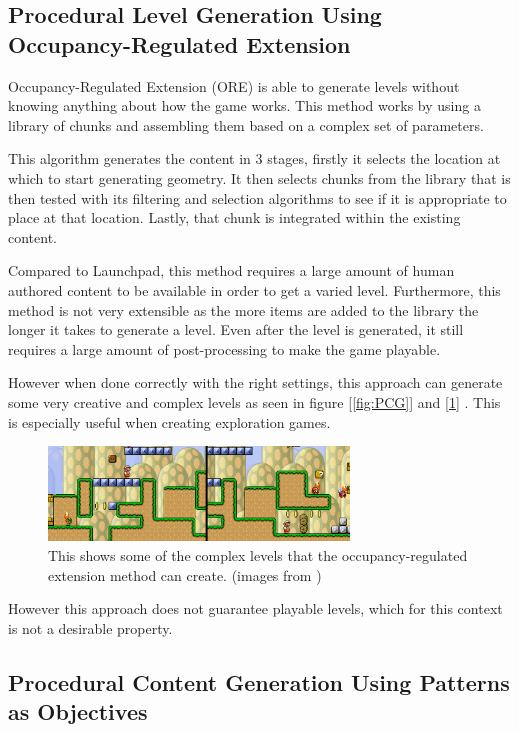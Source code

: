 \documentclass{scrartcl}
\begin{document}
\subsection{Procedural Level Generation Using Occupancy-Regulated Extension}

Occupancy-Regulated Extension (ORE) is able to generate levels without knowing anything about how the game works. This method works by using a library of chunks and assembling them based on a complex set of parameters. 

This algorithm generates the content in 3 stages, firstly it selects the location at which to start generating geometry. It then selects chunks from the library that is then tested with its filtering and selection algorithms to see if it is appropriate to place at that location. Lastly, that chunk is integrated within the existing content.

Compared to Launchpad, this method requires a large amount of human authored content to be available in order to get a varied level. Furthermore, this method is not very extensible as the more items are added to the library the longer it takes to generate a level. Even after the level is generated, it still requires a large amount of post-processing to make the game playable.\cite{mawhorter2010}

However when done correctly with the right settings, this approach can generate some very creative and complex levels as seen in figure [\ref{fig:PCG}] and [\ref{fig:ocupancyfig2}] . This is especially useful when creating exploration games.

\begin{figure}[t]
\includegraphics[width=8cm]{occupancy-complex}
\centering
    \caption{This shows some of the complex levels that the occupancy-regulated extension method can create. (images from \cite{mawhorter2010})}
    \label{fig:ocupancyfig2}
\end{figure}


However this approach does not guarantee playable levels, which for this context is not a desirable property.

\subsection{Procedural Content Generation Using Patterns as Objectives}
\end{document}
